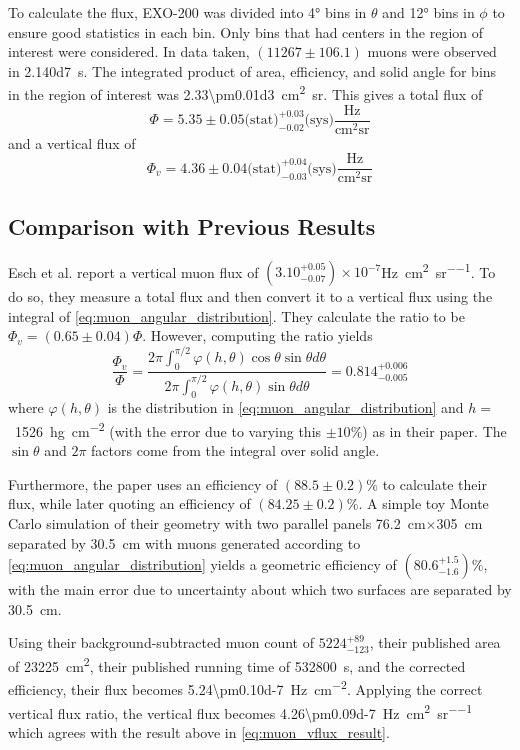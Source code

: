\documentclass[herrin-thesis.tex]{subfiles}
\begin{document}
To calculate the flux, EXO-200 was divided into \ang{4} bins in \(\theta\) and \ang{12} bins in \(\phi\) to ensure good statistics in each bin. Only bins that had centers in the region of interest were considered. In data taken, \((11267\pm106.1)\) muons were observed in \SI{2.140d7}{\second}. The integrated product of area, efficiency, and solid angle for bins in the region of interest was \SI{2.33\pm0.01d3}{\square\cm\steradian}. This gives a total flux of
\begin{equation}
\label{eq:muon_flux_result}
\Phi = 5.35\pm0.05\text{(stat)}^{+0.03}_{-0.02}\text{(sys)}\frac{\text{Hz}}{\text{cm}^2\text{sr}}
\end{equation}
and a vertical flux of
\begin{equation}
\label{eq:muon_vflux_result}
\Phi_v = 4.36\pm0.04\text{(stat)}^{+0.04}_{-0.03}\text{(sys)}\frac{\text{Hz}}{\text{cm}^2\text{sr}}
\end{equation}

\subsection{Comparison with Previous Results}
Esch et al.\cite{Esch:2004zj} report a vertical muon flux of \((3.10^{+0.05}_{-0.07})\times10^{-7}\)\si{\Hz\per\square\cm\per\steradian}. To do so, they measure a total flux and then convert it to a vertical flux using the integral of \cref{eq:muon_angular_distribution}. They calculate the ratio to be \(\Phi_v = (0.65\pm0.04)\Phi\). However, computing the ratio yields 
\begin{equation}
\label{eq:muon_esch_integral}
\frac{\Phi_v}{\Phi} = \frac{2 \pi \int_0^{\pi/2} \varphi(h,\theta)\cos\theta\sin\theta d\theta}{2 \pi \int_0^{\pi/2} \varphi(h,\theta)\sin\theta d\theta} = 0.814^{+0.006}_{-0.005}
\end{equation}
where \(\varphi(h,\theta)\) is the distribution in \cref{eq:muon_angular_distribution} and \(h = \)~\SI{1526}{\hecto\gram\per\square\cm} (with the error due to varying this \(\pm10\%\)) as in their paper. The \(\sin\theta\) and \(2 \pi\) factors come from the integral over solid angle.

Furthermore, the paper uses an efficiency of \((88.5\pm0.2)\%\) to calculate their flux, while later quoting an efficiency of \((84.25\pm0.2)\%\). A simple toy Monte Carlo simulation of their geometry with two parallel panels \SI{76.2}{\cm}\(\times\)\SI{305}{\cm} separated by \SI{30.5}{\cm} with muons generated according to \cref{eq:muon_angular_distribution} yields a geometric efficiency of \((80.6^{+1.5}_{-1.6})\%\), with the main error due to uncertainty about which two surfaces are separated by \SI{30.5}{\cm}.

Using their background-subtracted muon count of \(5224^{+89}_{-123}\), their published area of \SI{23225}{\square\cm}, their published running time of \SI{532800}{s}, and the corrected efficiency, their flux becomes \SI{5.24\pm0.10d-7}{\Hz\per\square\cm}. Applying the correct vertical flux ratio, the vertical flux becomes \SI{4.26\pm0.09d-7}{\Hz\per\square\cm\per\steradian} which agrees with the result above in \cref{eq:muon_vflux_result}.

%
%
\end{document}
